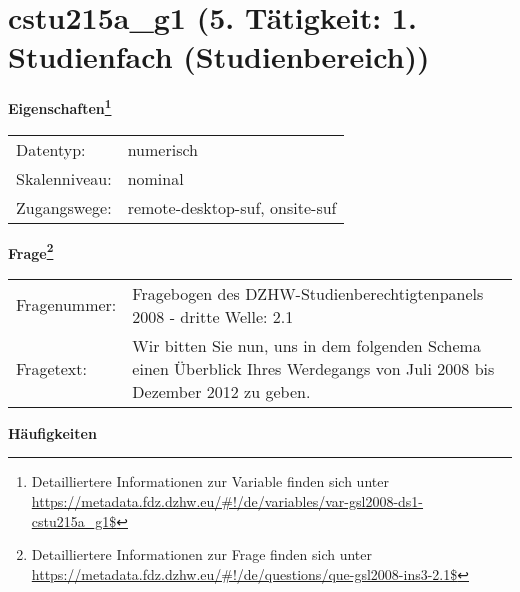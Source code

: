 
    \setcounter{footnote}{0}

    \vspace*{-1.8cm}
	\section{cstu215a\_g1 (5. Tätigkeit: 1. Studienfach (Studienbereich))}
	\label{section:cstu215a_g1}



    \vspace*{0.5cm}
    \noindent\textbf{Eigenschaften\footnote{Detailliertere Informationen zur Variable finden sich unter
		\url{https://metadata.fdz.dzhw.eu/\#!/de/variables/var-gsl2008-ds1-cstu215a_g1$}}}\\
	\begin{tabularx}{\hsize}{@{}lX}
	Datentyp: & numerisch \\
	Skalenniveau: & nominal \\
	Zugangswege: &
	  remote-desktop-suf, 
	  onsite-suf
 \\
    \end{tabularx}



				\vspace*{0.5cm}
                \noindent\textbf{Frage\footnote{Detailliertere Informationen zur Frage finden sich unter
		              \url{https://metadata.fdz.dzhw.eu/\#!/de/questions/que-gsl2008-ins3-2.1$}}}\\
				\begin{tabularx}{\hsize}{@{}lX}
					Fragenummer: &
					  Fragebogen des DZHW-Studienberechtigtenpanels 2008 - dritte Welle:
					  2.1
 \\
					Fragetext: & Wir bitten Sie nun, uns in dem folgenden Schema einen Überblick Ihres Werdegangs von Juli 2008 bis Dezember 2012 zu geben. \\
				\end{tabularx}





        		\vspace*{0.5cm}
                \noindent\textbf{Häufigkeiten}

